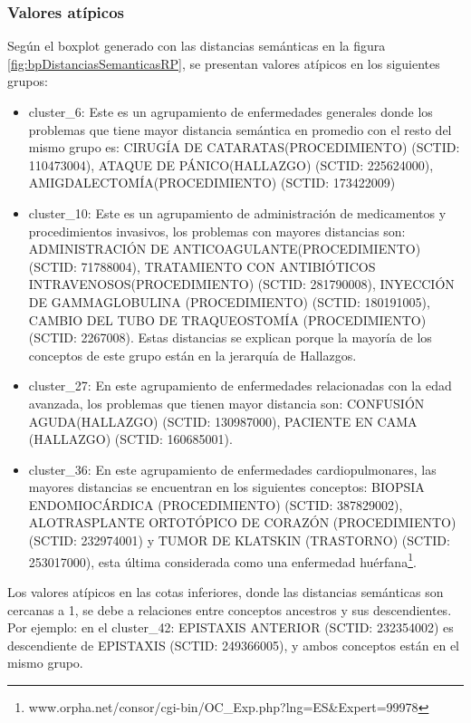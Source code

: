 \subsubsection{Valores atípicos}
Según el boxplot generado con las distancias semánticas en la figura \ref{fig:bpDistanciasSemanticasRP}, se presentan valores atípicos en los siguientes grupos:
\begin{itemize}
\item cluster\_6: Este es un agrupamiento de enfermedades generales donde los problemas que tiene mayor distancia semántica en promedio con el resto del mismo grupo es: CIRUGÍA DE CATARATAS(PROCEDIMIENTO) (SCTID: 110473004), ATAQUE DE PÁNICO(HALLAZGO) (SCTID: 225624000), AMIGDALECTOMÍA(PROCEDIMIENTO) (SCTID: 173422009)
\item cluster\_10: Este es un agrupamiento de administración de medicamentos y procedimientos invasivos, los problemas con mayores distancias son: ADMINISTRACIÓN DE ANTICOAGULANTE(PROCEDIMIENTO) (SCTID: 71788004), TRATAMIENTO CON ANTIBIÓTICOS INTRAVENOSOS(PROCEDIMIENTO) (SCTID: 281790008), INYECCIÓN DE GAMMAGLOBULINA (PROCEDIMIENTO) (SCTID: 180191005), CAMBIO DEL TUBO DE TRAQUEOSTOMÍA (PROCEDIMIENTO) (SCTID: 2267008). Estas distancias se explican porque la mayoría de los conceptos de este grupo están en la jerarquía de Hallazgos.
\item cluster\_27: En este agrupamiento de enfermedades relacionadas con la edad avanzada, los problemas que tienen mayor distancia son: CONFUSIÓN AGUDA(HALLAZGO) (SCTID: 130987000), PACIENTE EN CAMA (HALLAZGO) (SCTID: 160685001).
\item cluster\_36: En este agrupamiento de enfermedades cardiopulmonares, las mayores distancias se encuentran en los siguientes conceptos: BIOPSIA ENDOMIOCÁRDICA (PROCEDIMIENTO) (SCTID: 387829002), ALOTRASPLANTE ORTOTÓPICO DE CORAZÓN (PROCEDIMIENTO) (SCTID: 232974001) y TUMOR DE KLATSKIN (TRASTORNO) (SCTID: 253017000), esta última considerada como una enfermedad huérfana\footnote{www.orpha.net/consor/cgi-bin/OC\_Exp.php?lng=ES\&Expert=99978}.
\end{itemize}

Los valores atípicos en las cotas inferiores, donde las distancias semánticas son cercanas a 1,  se debe a relaciones entre conceptos ancestros y sus descendientes. Por ejemplo: en el cluster\_42: EPISTAXIS ANTERIOR (SCTID: 232354002) es descendiente de EPISTAXIS (SCTID: 249366005), y ambos conceptos están en el mismo grupo.

